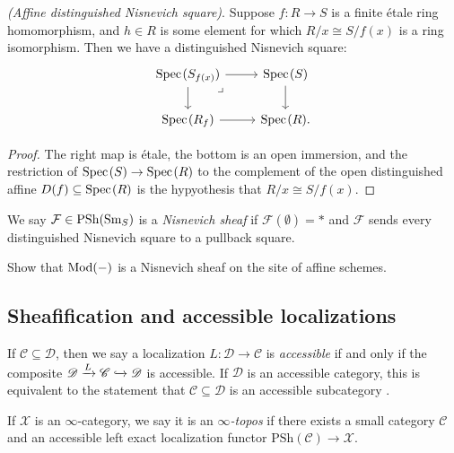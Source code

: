 \documentclass[11pt]{amsart}
\renewcommand{\Pre}{\mathrm{PSh}}
\begin{document}
\begin{example}\label{ex:affine-distinguished-nisnevich-square} \textit{(Affine distinguished Nisnevich square)}. Suppose $f: R \to S$ is a finite \'etale ring homomorphism, and $h\in R$ is some element for which $R/x \cong S/f(x)$ is a ring isomorphism. Then we have a distinguished Nisnevich square:
\[ \begin{tikzcd}
    \Spec(S_{f(x)})\rar\dar\pb & \Spec(S)\dar\\
    \Spec(R_f)\rar & \Spec(R).
\end{tikzcd} \]
\end{example}
\begin{proof} The right map is \'etale, the bottom is an open immersion, and the restriction of $\text{Spec}\hspace{0.1em}(S) \to \text{Spec}\hspace{0.1em}(R)$ to the complement of the open distinguished affine $D(f) \subseteq \text{Spec}\hspace{0.1em}(R)$ is the hypyothesis that $R/x \cong S/f(x)$.
\end{proof}

\begin{definition} We say $\mathcal{F} \in \Pre(\Sm_S)$ is a \textit{Nisnevich sheaf} if $\mathcal{F}(\emptyset)= \ast$ and $\mathcal{F}$ sends every distinguished Nisnevich square to a pullback square.
\end{definition}

\begin{exercise} Show that $\mathrm{Mod}(-)$ is a Nisnevich sheaf on the site of affine schemes.
\end{exercise}



\subsection{Sheafification and accessible localizations}

\begin{definition} If $\mathscr{C} \subseteq \mathscr{D}$, then we say a localization $L \colon \mathscr{D} \to \mathscr{C}$ is \textit{accessible} if and only if the composite $\mathscr{D} \xrightarrow{L} \mathscr{C} \xhookrightarrow{} \mathscr{D}$ is accessible. If $\mathscr{D}$ is an accessible category, this is equivalent to the statement that $\mathscr{C} \subseteq \mathscr{D}$ is an accessible subcategory \cite[5.5.4.2]{HTT}.
\end{definition}



\begin{definition} \cite[6.1.0.4]{HTT} If $\mathscr{X}$ is an $\infty$-category, we say it is an $\infty$\textit{-topos} if there exists a small category $\mathscr{C}$ and an accessible left exact localization functor $\Pre(\mathscr{C}) \to \mathscr{X}$.
\end{definition}
\end{document}
